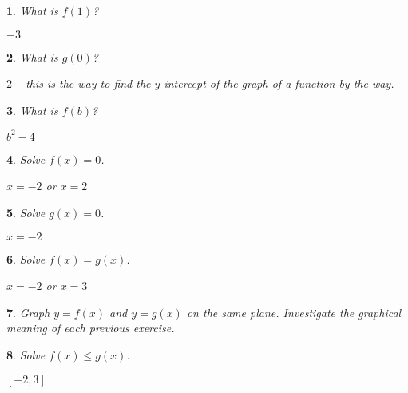 \documentclass{amsbook}
\newtheorem{exc}{}
\newenvironment{ex}{\begin{exc}\normalfont}{\end{exc}}
\numberwithin{section}{chapter}
\numberwithin{equation}{chapter}
\newcommand{\drawgridxxyy}[4]{
	\draw[thin, color=lightgray] (#1,#3) grid (#2,#4);
	\draw[thick,->] (#1,0) -- (#2,0) node[right] {$x$}; 
	\draw[thick, ->] (0,#3) -- (0,#4) node[above] {$y$};
}
\begin{document}
	\begin{multicols}{2}
	\begin{ex}
		What is $f(1)$?
		\begin{sol}
			$-3$
		\end{sol}
	\end{ex}
	\begin{ex}
	What is $g(0)$?
	\begin{sol}
		$2$ -- this is the way to find the $y$-intercept of the graph of a function by the way. 
	\end{sol}
	\end{ex}
	\begin{ex}
	What is $f(b)$?
	\begin{sol}
		$b^2-4$
	\end{sol}
\end{ex}
	\begin{ex}
	Solve $f(x) = 0$.
	\begin{sol}
		$x=-2$ or $x=2$
	\end{sol}
\end{ex}
	\begin{ex}
	Solve $g(x) = 0$.
	\begin{sol}
		$x=-2$
	\end{sol}
\end{ex}
	\begin{ex}
	Solve $f(x) = g(x)$.
	\begin{sol}
		$x=-2$ or $x=3$
	\end{sol}
\end{ex}
	\begin{ex}
	Graph $y=f(x)$ and $y=g(x)$ on the same plane. Investigate the graphical meaning of each previous exercise.
\end{ex}
	\begin{ex}
	Solve $f(x) \leq g(x)$.
	\begin{sol}
		$[-2,3]$
	\end{sol}
\end{ex}
	\end{multicols}

\end{document}
